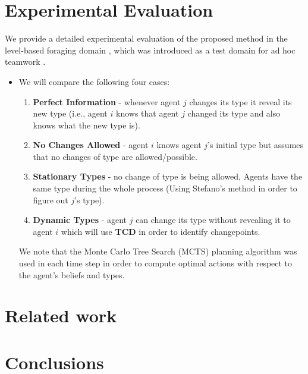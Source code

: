 \documentclass{article}
\begin{document}


 

\section{Experimental Evaluation}
We provide a detailed experimental evaluation of the proposed method in the level-based foraging domain \cite{albrecht2013game}, which was introduced as a test domain for ad hoc teamwork \cite{stone2010ad}. 



\begin{itemize}
	\item We will compare the following four cases: 	\begin{enumerate}
		\item \textbf{Perfect Information} - whenever agent $j$ changes its type it reveal its new type (i.e., agent $i$ knows that agent $j$ changed its type and also knows what the new type is).
		\item \textbf{No Changes Allowed} - agent $i$ knows agent $j$'s initial type but assumes that no changes of type are allowed/possible.
		\item \textbf{Stationary Types} - no change of type is being allowed, Agents have the same type during the whole process (Using Stefano's method in order to figure out $j$'s type).
		\item \textbf{Dynamic Types} - agent $j$ can change its type without revealing it to agent $i$ which will use \textbf{TCD} in order to identify changepoints.
	\end{enumerate}
	We note that the Monte Carlo Tree Search (MCTS) planning algorithm was used in each time step in order to compute optimal actions with respect to the agent's beliefs and types.
\end{itemize}

\section{Related work}

\section{Conclusions}





%
  
\end{document}
